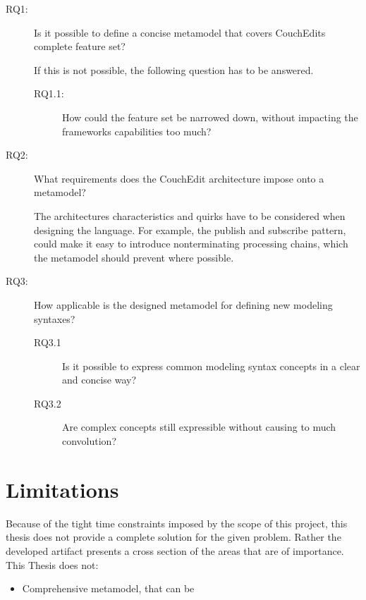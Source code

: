 \begin{description} 
  \item[RQ1:]  Is it possible to define a concise metamodel that covers CouchEdits complete feature set?

        If this is not possible, the following question has to be answered.
        \begin{description}
          \item[RQ1.1:] How could the feature set be narrowed down, without impacting the frameworks capabilities too much?
        \end{description}

  \item[RQ2:] What requirements does the CouchEdit architecture impose onto a metamodel?

        The architectures characteristics and quirks have to be considered when designing the language. For example, the publish and subscribe pattern, could make it easy to introduce nonterminating processing chains, which the metamodel should prevent where possible.

  \item[RQ3:] How applicable is the designed metamodel for defining new modeling syntaxes?

        \begin{description}
          \item[RQ3.1] Is it possible to express common modeling syntax concepts in a clear and concise way?
          \item[RQ3.2] Are complex concepts still expressible without causing to much convolution?
        \end{description}
\end{description}


\section{Limitations}
Because of the tight time constraints imposed by the scope of this project, this thesis does not provide a complete solution for the given problem. Rather the developed artifact presents a cross section of the areas that are of importance. This Thesis does not:

\begin{itemize}
  \item Comprehensive metamodel, that can be 
\end{itemize}

